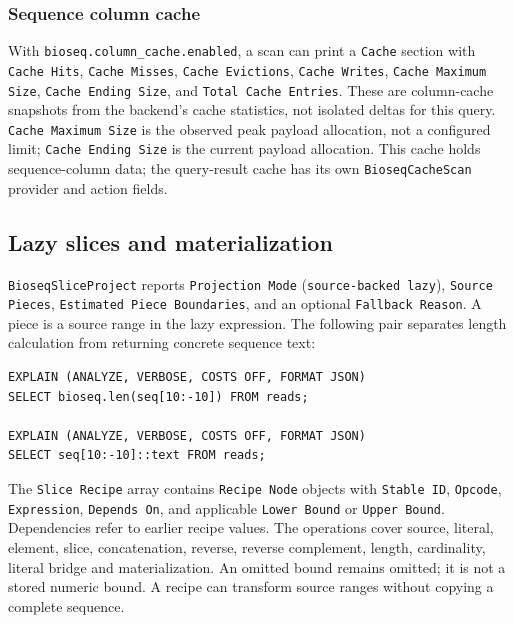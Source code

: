 \subsubsection{Sequence column cache}

With \nolinkurl{bioseq.column_cache.enabled}, a scan can print a \texttt{Cache}
section with \texttt{Cache Hits}, \texttt{Cache Misses},
\texttt{Cache Evictions}, \texttt{Cache Writes},
\texttt{Cache Maximum Size}, \texttt{Cache Ending Size}, and
\texttt{Total Cache Entries}. These are column-cache snapshots from the
backend's cache statistics, not isolated deltas for this query.
\texttt{Cache Maximum Size} is the observed peak payload allocation, not a
configured limit; \texttt{Cache Ending Size} is the current payload allocation.
This cache
holds sequence-column data; the query-result cache has its own
\texttt{BioseqCacheScan} provider and action fields.

\subsection{Lazy slices and materialization}

\texttt{BioseqSliceProject} reports \texttt{Projection Mode}
(\texttt{source-backed lazy}), \texttt{Source Pieces},
\texttt{Estimated Piece Boundaries}, and an optional \texttt{Fallback Reason}.
A piece is a source range in the lazy expression. The following pair separates
length calculation from returning concrete sequence text:

\par\noindent\begin{minipage}{\linewidth}
\begin{lstlisting}[style=bioseq-appendix-sql]
EXPLAIN (ANALYZE, VERBOSE, COSTS OFF, FORMAT JSON)
SELECT bioseq.len(seq[10:-10]) FROM reads;

EXPLAIN (ANALYZE, VERBOSE, COSTS OFF, FORMAT JSON)
SELECT seq[10:-10]::text FROM reads;
\end{lstlisting}
\end{minipage}

The \texttt{Slice Recipe} array contains \texttt{Recipe Node} objects with
\texttt{Stable ID}, \texttt{Opcode}, \texttt{Expression},
\texttt{Depends On}, and applicable \texttt{Lower Bound} or
\texttt{Upper Bound}. Dependencies refer to earlier recipe values.
The operations cover source, literal, element, slice, concatenation, reverse,
reverse complement, length, cardinality, literal bridge and materialization.
An omitted bound remains omitted; it is not a stored numeric bound.
A recipe can transform source ranges without copying a complete sequence.

